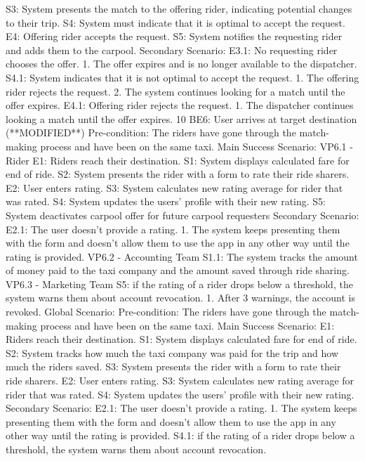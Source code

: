S3: System presents the match to the offering rider, indicating potential changes to their trip.
S4: System must indicate that it is optimal to accept the request.
E4: Offering rider accepts the request.
S5: System notifies the requesting rider and adds them to the carpool.
Secondary Scenario:
E3.1: No requesting rider chooses the offer.
1. The offer expires and is no longer available to the dispatcher.
S4.1: System indicates that it is not optimal to accept the request.
1. The offering rider rejects the request.
2. The system continues looking for a match until the offer expires.
E4.1: Offering rider rejects the request.
1. The dispatcher continues looking a match until the offer expires.
10
BE6: User arrives at target destination (**MODIFIED**)
Pre-condition: The riders have gone through the match-making process and have been on the same
taxi.
Main Success Scenario:
VP6.1 - Rider
E1: Riders reach their destination.
S1: System displays calculated fare for end of ride.
S2: System presents the rider with a form to rate their ride sharers.
E2: User enters rating.
S3: System calculates new rating average for rider that was rated.
S4: System updates the users’ profile with their new rating.
S5: System deactivates carpool offer for future carpool requesters
Secondary Scenario:
E2.1: The user doesn’t provide a rating.
1. The system keeps presenting them with the form and doesn’t allow them to use the app in any
other way until the rating is provided.
VP6.2 - Accounting Team
S1.1: The system tracks the amount of money paid to the taxi company and the amount saved
through ride sharing.
VP6.3 - Marketing Team
S5: if the rating of a rider drops below a threshold, the system warns them about account revocation.
1. After 3 warnings, the account is revoked.
Global Scenario:
Pre-condition: The riders have gone through the match-making process and have been on the same
taxi.
Main Success Scenario:
E1: Riders reach their destination.
S1: System displays calculated fare for end of ride.
S2: System tracks how much the taxi company was paid for the trip and how much the riders saved.
S3: System presents the rider with a form to rate their ride sharers.
E2: User enters rating.
S3: System calculates new rating average for rider that was rated.
S4: System updates the users’ profile with their new rating.
Secondary Scenario:
E2.1: The user doesn’t provide a rating.
1. The system keeps presenting them with the form and doesn’t allow them to use the app in any
other way until the rating is provided.
S4.1: if the rating of a rider drops below a threshold, the system warns them about account revocation.
